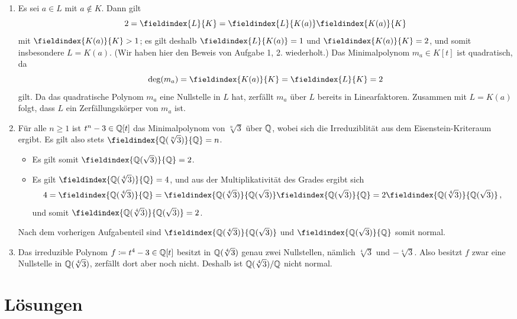\documentclass[a4paper, 10pt]{scrartcl}
\begin{document}
\begin{solution}
  \begin{enumerate}
    \item
      Es sei $a \in L$ mit $a \notin K$.
      Dann gilt
      \[
          2
        = \fieldindex{L}{K}
        = \fieldindex{L}{K(a)} \fieldindex{K(a)}{K}
      \]
      mit $\fieldindex{K(a)}{K} > 1$;
      es gilt deshalb $\fieldindex{L}{K(a)} = 1$ und $\fieldindex{K(a)}{K} = 2$, und somit insbesondere $L = K(a)$.
      (Wir haben hier den Beweis von Aufgabe 1, 2. wiederholt.)
      Das Minimalpolynom $m_a \in K[t]$ ist quadratisch, da
      \[
          \deg(m_a)
        = \fieldindex{K(a)}{K}
        = \fieldindex{L}{K}
        = 2
      \]
      gilt.
      Da das quadratische Polynom $m_a$ eine Nullstelle in $L$ hat, zerfällt $m_a$ über $L$ bereits in Linearfaktoren.
      Zusammen mit $L = K(a)$ folgt, dass $L$ ein Zerfällungskörper von $m_a$ ist.
    \item
      Für alle $n \geq 1$ ist $t^n - 3 \in \mathbb{Q}[t]$ das Minimalpolynom von $\sqrt[n]{3}$ über $\mathbb{Q}$, wobei sich die Irreduziblität aus dem Eisenstein-Kriteraum ergibt.
      Es gilt also stets $\fieldindex{\Rational(\sqrt[n]{3})}{\Rational} = n$.
      \begin{itemize}
        \item
          Es gilt somit $\fieldindex{\Rational(\sqrt{3})}{\Rational} = 2$.
        \item
          Es gilt $\fieldindex{\Rational(\sqrt[4]{3})}{\Rational} = 4$, und aus der Multiplikativität des Grades ergibt sich
          \[
              4
            = \fieldindex{\Rational(\sqrt[4]{3})}{\Rational}
            = \fieldindex{\Rational(\sqrt[4]{3})}{\Rational(\sqrt{3})}
              \fieldindex{\Rational(\sqrt{3})}{\Rational}
            = 2\fieldindex{\Rational(\sqrt[4]{3})}{\Rational(\sqrt{3})} \,,
          \]
          und somit $\fieldindex{\Rational(\sqrt[4]{3})}{\Rational(\sqrt{3})} = 2$.
      \end{itemize}
      Nach dem vorherigen Aufgabenteil sind $\fieldindex{\Rational(\sqrt[4]{3})}{\Rational(\sqrt{3})}$ und $\fieldindex{\Rational(\sqrt{3})}{\Rational}$ somit normal.
    \item
      Das irreduzible Polynom $f \coloneqq t^4 - 3 \in \mathbb{Q}[t]$ besitzt in $\mathbb{Q}(\sqrt[4]{3})$ genau zwei Nullstellen, nämlich $\sqrt[4]{3}$ und $-\sqrt[4]{3}$.
      Also besitzt $f$ zwar eine Nullstelle in $\mathbb{Q}(\sqrt[4]{3})$, zerfällt dort aber noch nicht.
      Deshalb ist $\mathbb{Q}(\sqrt[4]{3})/\mathbb{Q}$ nicht normal.
  \end{enumerate}
\end{solution}





\pagebreak





\section*{Lösungen}

\printsolutions
\end{document}
